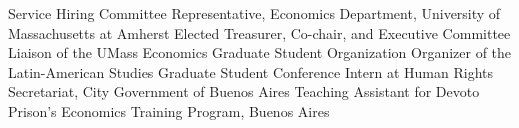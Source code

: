 
\def\arraystretch{1.3}

\begin{rubric}{Service}
\entry*[2007] Hiring Committee Representative, Economics Department, University of Massachusetts at Amherst
\entry*[2004--2006] Elected Treasurer, Co-chair, and Executive Committee Liaison of the UMass Economics Graduate Student Organization
\entry*[Spring 2005] Organizer of the Latin-American Studies Graduate Student Conference
\entry*[2001] Intern at Human Rights Secretariat, City Government of Buenos Aires
\entry*[1998] Teaching Assistant for Devoto Prison's Economics Training Program, Buenos Aires
\end{rubric} 